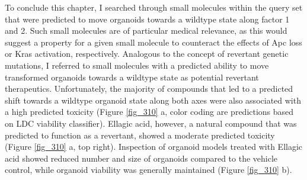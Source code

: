 \begin{flushleft}
To conclude this chapter, I searched through small molecules within the query set that were predicted to move organoids towards a wildtype state along factor 1 and 2. Such small molecules are of particular medical relevance, as this would suggest a property for a given small molecule to counteract the effects of Apc loss or Kras activation, respectively. Analogous to the concept of revertant genetic mutations, I referred to small molecules with a predicted ability to move transformed organoids towards a wildtype state as potential revertant therapeutics. Unfortunately, the majority of compounds that led to a predicted shift towards a wildtype organoid state along both axes were also associated with a high predicted toxicity (Figure \ref{fig_310} a, color coding are predictions based on LDC viability classifier). Ellagic acid, however, a natural compound that was predicted to function as a revertant, showed a moderate predicted toxicity (Figure \ref{fig_310} a, top right). Inspection of organoid models treated with Ellagic acid showed reduced number and size of organoids compared to the vehicle control, while organoid viability was generally maintained (Figure \ref{fig_310} b). 


\end{flushleft}
